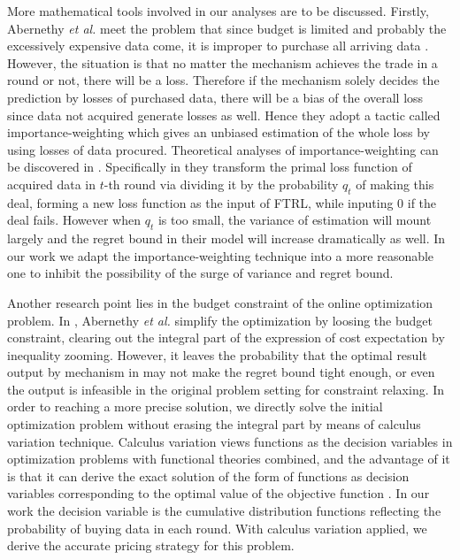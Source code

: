 \documentclass[10pt,conference,compsocconf,letterpaper]{IEEEtran}
\begin{document}
More mathematical tools involved in our analyses are to be discussed. Firstly, Abernethy \emph{et al.} meet the problem that since budget is limited and probably the excessively expensive data come, it is improper to purchase all arriving data \cite{abernethy2015low}. However, the situation is that no matter the mechanism achieves the trade in a round or not, there will be a loss. Therefore if the mechanism solely decides the prediction by losses of purchased data, there will be a bias of the overall loss since data not acquired generate losses as well. Hence they adopt a tactic called importance-weighting which gives an unbiased estimation of the whole loss by using losses of data procured. Theoretical analyses of importance-weighting can be discovered in \cite{beygelzimer2009importance}. Specifically in \cite{abernethy2015low} they transform the primal loss function of acquired data in $t$-th round via dividing it by the probability $q_t$ of making this deal, forming a new loss function as the input of FTRL, while inputing 0 if the deal fails. However when $q_t$ is too small, the variance of estimation will mount largely and the regret bound in their model will increase dramatically as well. In our work we adapt the importance-weighting technique into a more reasonable one to inhibit the possibility of the surge of variance and regret bound.

Another research point lies in the budget constraint of the online optimization problem. In \cite{abernethy2015low},
Abernethy \emph{et al.} simplify the optimization by loosing the budget constraint, clearing out the integral part of the expression of cost expectation by inequality zooming. However, it leaves the probability that the optimal result output by mechanism in \cite{abernethy2015low} may not make the regret bound tight enough, or even the output is infeasible in the original problem setting for constraint relaxing. In order to reaching a more precise solution, we directly solve the initial optimization problem without erasing the integral part by means of calculus variation technique. Calculus variation views functions as the decision variables in optimization problems with functional theories combined, and the advantage of it is that it can derive the exact solution of the form of functions as decision variables corresponding to the optimal value of the objective function \cite{liberzon2012calculus,roth2012conducting}. In our work the decision variable is the cumulative distribution functions reflecting the probability of buying data in each round. With calculus variation applied, we derive the accurate pricing strategy for this problem.
\end{document}
